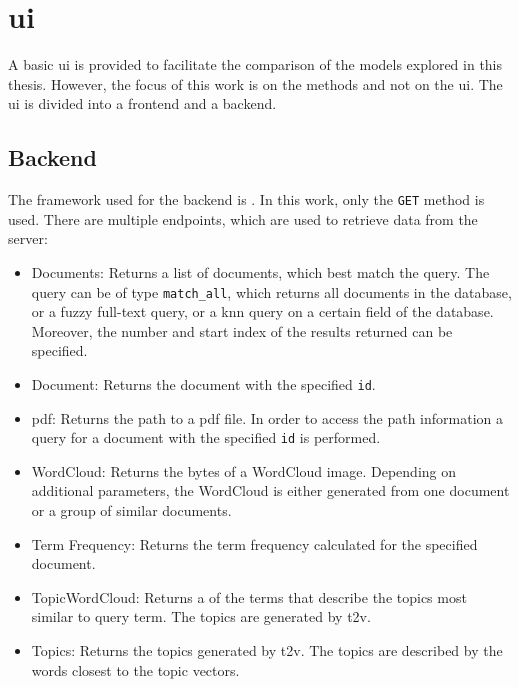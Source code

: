 \section{\acl*{ui}}\label{sec:ui}

A basic \ac{ui} is provided to facilitate the comparison of the models explored in this thesis.
However, the focus of this work is on the methods and not on the \ac{ui}.
The \ac{ui} is divided into a frontend and a backend.

\subsection{Backend}\label{subsec:backend}

The framework used for the backend is \flask{}.
In this work, only the \texttt{GET} method is used.
There are multiple endpoints, which are used to retrieve data from the server:

\begin{itemize}
    \item \label{pt:docs}Documents: 
        Returns a list of documents, which best match the query.
        The query can be of type \texttt{match\_all}, which returns all documents in the database, 
        or a fuzzy full-text query, 
        or a \ac{knn} query on a certain field of the database.
        Moreover, the number and start index of the results returned can be specified.

    \item \label{pt:doc}Document: 
        Returns the document with the specified \texttt{id}.

    \item \label{pt:pdf}\ac{pdf}: 
        Returns the path to a \ac{pdf} file.
        In order to access the path information a query for a document with the specified \texttt{id} is performed.
    
    \item \label{pt:wordcloud}WordCloud: 
        Returns the bytes of a WordCloud image. 
        Depending on additional parameters, the WordCloud is either generated from one document or 
        a group of similar documents.

    \item \label{pt:termfrequency}Term Frequency:
        Returns the term frequency calculated for the specified document.

    \item \label{pt:topic_wordcloud}TopicWordCloud:
        Returns a \wordcloud{} of the terms that describe the topics most similar to query term.
        The topics are generated by \ac{t2v}.

    \item \label{pt:topic}Topics: 
        Returns the topics generated by \ac{t2v}. 
        The topics are described by the words closest to the topic vectors.
\end{itemize}

